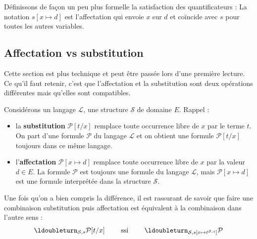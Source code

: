 \documentclass[11pt,class=report,crop=false]{standalone}
\begin{document}
Définissons de façon un peu plus formelle la satisfaction des quantificateurs :
La notation $s[x \mapsto d]$ est l'affectation qui envoie $x$ sur $d$ et coïncide avec $s$ pour toutes les autres variables.


\subsection{Affectation vs substitution}


Cette section est plus technique et peut être passée lors d'une première lecture.
Ce qu'il faut retenir, c'est que l'affectation et la substitution sont deux opérations différentes mais qu'elles sont compatibles.

Considérons un langage $\mathcal{L}$, une structure $\mathcal{S}$ de domaine $E$. Rappel :
\begin{itemize}
	\item la \textbf{substitution} $\mathcal{P}[t/x]$ remplace toute occurrence libre de $x$ par le terme $t$. On part d'une formule $\mathcal{P}$ du langage $\mathcal{L}$ et on obtient une formule $\mathcal{P}[t/x]$ toujours dans ce même langage. 
	
	\item l'\textbf{affectation} $\mathcal{P}[x \mapsto d]$ remplace toute occurrence libre de $x$ par la valeur $d \in E$. La formule $\mathcal{P}$ est toujours une formule du langage $\mathcal{L}$, mais $\mathcal{P}[x \mapsto d]$ est une formule interprétée dans la structure $\mathcal{S}$.
\end{itemize}

Une fois qu'on a bien compris la différence, il est rassurant de savoir que faire une combinaison substitution puis affectation est équivalent à la combinaison dans l'autre sens :
\[
\ldoubleturn_{\mathcal{S},s} \mathcal{P}[t/x]
\qquad \text{ ssi } \qquad
\ldoubleturn_{\mathcal{S},s[x\mapsto t^{\mathcal{S},s}]} \mathcal{P}
\]
\end{document}
